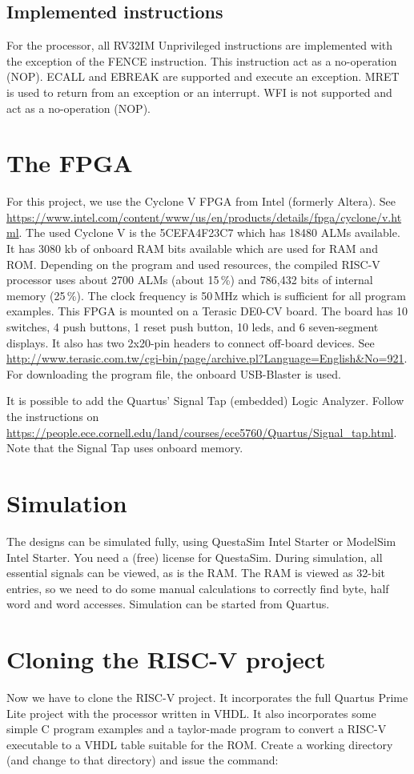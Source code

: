 \documentclass[12pt]{article}
\begin{document}
\subsection{Implemented instructions}
For the processor, all RV32IM Unprivileged instructions are implemented with the exception of the FENCE instruction. This instruction act as a no-operation (NOP). ECALL and EBREAK are supported and execute an exception. MRET is used to return from an exception or an interrupt. WFI is not supported and act as a no-operation (NOP).

\section{The FPGA}
For this project, we use the Cyclone V FPGA from Intel (formerly Altera). See \url{https://www.intel.com/content/www/us/en/products/details/fpga/cyclone/v.html}.
The used Cyclone V is the 5CEFA4F23C7 which has 18480 ALMs available. It has 3080 kb of onboard RAM bits available which are used for RAM and ROM. Depending on the program and used resources, the compiled RISC-V processor uses about 2700 ALMs (about 15\,\%) and 786,432 bits of internal memory (25\,\%). The clock frequency is 50\,MHz which is sufficient for all program examples. This FPGA is mounted on a Terasic DE0-CV board. The board has 10 switches, 4 push buttons, 1 reset push button, 10 leds, and 6 seven-segment displays. It also has two 2x20-pin headers to connect off-board devices. See \url{http://www.terasic.com.tw/cgi-bin/page/archive.pl?Language=English&No=921}. For downloading the program file, the onboard USB-Blaster is used.

It is possible to add the Quartus' Signal Tap (embedded) Logic Analyzer. Follow the instructions on \url{https://people.ece.cornell.edu/land/courses/ece5760/Quartus/Signal_tap.html}. Note that the Signal Tap uses onboard memory.

\section{Simulation}
The designs can be simulated fully, using QuestaSim Intel Starter or ModelSim Intel Starter. You need a (free) license for QuestaSim. During simulation, all essential signals can be viewed, as is the RAM. The RAM is viewed as 32-bit entries, so we need to do some manual calculations to correctly find byte, half word and word accesses. Simulation can be started from Quartus.

\section{Cloning the RISC-V project}
\label{sec:cloning}
Now we have to clone the RISC-V project. It incorporates the full Quartus Prime Lite project with the processor written in VHDL. It also incorporates some simple C program examples and a taylor-made program to convert a RISC-V executable to a VHDL table suitable for the ROM. Create a working directory (and change to that directory) and issue the command:
\end{document}
